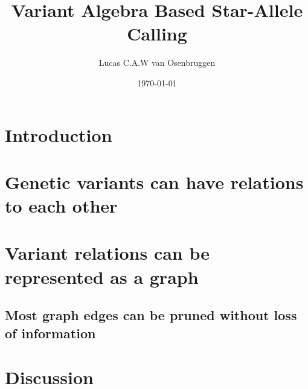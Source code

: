 \documentclass[a4paper, 10pt]{article}
\title{Variant Algebra Based Star-Allele Calling\\}
\author[1]{Lucas C.A.W van Osenbruggen}
\affil[1]{Leiden Institute of Advanced Computer Science, Leiden University}
\date{\today}
\begin{document}
%
\maketitle
\thispagestyle{fancy}
\newpage
%
\begin{abstract}
    
\end{abstract}
\newpage
%
\tableofcontents
\newpage
%
\section{Introduction}
\label{section:Introduction}

\newpage
%
\section{Genetic variants can have relations to each other}
\label{section:Relations}
%
%
\section{Variant relations can be represented as a graph}
\label{section:Graph}
%
%
\subsection{Most graph edges can be pruned without loss of information}

\label{ssection:Pruning}
\newpage
%
\section{Discussion}
\label{section:Discussion}

\newpage
%
\end{document}
